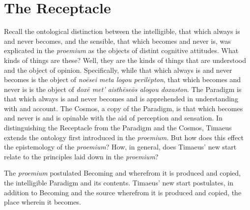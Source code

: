 

\section{The Receptacle} %
\label{sec:the_receptacle}



Recall the ontological distinction between the intelligible, that which always is and never becomes, and the sensible, that which becomes and never is, was explicated in the \emph{proemium} as the objects of distint cognitive attitudes. What kinds of things are these? Well, they are the kinds of things that are understood and the object of opinion. Specifically, while that which always is and never becomes is the object of \emph{noēsei meta logou perilēpton}, that which becomes and never is is the object of \emph{doxē met’ aisthēseōs alogou doxaston}. The Paradigm is that which always is and never becomes and is apprehended in understanding with and account. The Cosmos, a copy of the Paradigm, is that which becomes and never is and is opinable with the aid of perception and sensation. In distinguishing the Receptacle from the Paradigm and the Cosmos, Timaeus extends the ontology first introduced in the \emph{proemium}. But how does this effect the epistemology of the \emph{proemium}? How, in general, does Timaeus' new start relate to the principles laid down in the \emph{proemium}?

The \emph{proemium} postulated Becoming and wherefrom it is produced and copied, the intelligible Paradigm and its contents. Timaeus' new start postulates, in addition to Becoming and the source wherefrom it is produced and copied, the place wherein it becomes.

